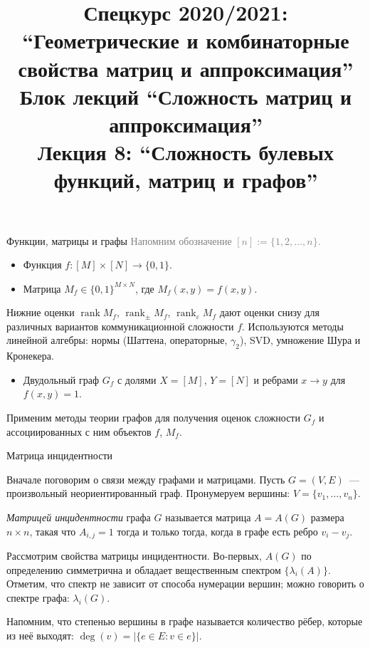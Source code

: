 \documentclass{beamer}
\title{Спецкурс 2020/2021: ``Геометрические и комбинаторные свойства матриц и
аппроксимация'' \\ Блок лекций ``Сложность матриц и аппроксимация'' \\ Лекция 8:
``Сложность булевых функций, матриц и графов''}
\newcommand\eps{\varepsilon}
\DeclareMathOperator{\rank}{rank}
\begin{document}
\maketitle

\begin{frame}{Функции, матрицы и графы}
    \textcolor{gray}{Напомним обозначение $[n]:=\{1,2,\ldots,n\}$.}

    \begin{itemize}
        \item Функция $f\colon [M]\times [N]\to\{0,1\}$.\pause
        \item Матрица $M_f\in\{0,1\}^{M\times N}$, где $M_f(x,y)=f(x,y)$.\pause
    \end{itemize}

    Нижние оценки $\rank M_f$, $\rank_\pm M_f$, $\rank_\eps M_f$ дают
    оценки снизу для различных вариантов коммуникационной сложности $f$.
    Используются методы линейной алгебры: нормы (Шаттена, операторные,
    $\gamma_2$), SVD, умножение Шура и Кронекера.\pause

    \begin{itemize}
        \item Двудольный граф $G_f$ с долями $X=[M]$, $Y=[N]$ и ребрами $x\to y$
            для $f(x,y)=1$.
    \end{itemize}
    \pause

    Применим методы теории графов для получения оценок сложности $G_f$ и
    ассоциированных с ним объектов $f$, $M_f$.

\end{frame}

\begin{frame}{Матрица инцидентности}

    Вначале поговорим о связи между графами и матрицами. Пусть $G=(V,E)$~---
    произвольный неориентированный граф. Пронумеруем вершины:
    $V=\{v_1,\ldots,v_n\}$.
    \pause\vspace{5pt}

    \textit{Матрицей инцидентности} графа $G$ называется матрица $A=A(G)$ размера
    $n\times n$, такая что $A_{i,j}=1$ тогда и только тогда, когда в графе
    есть ребро $v_i-v_j$.
    \pause\vspace{5pt}

    Рассмотрим свойства матрицы инцидентности. Во-первых, $A(G)$ по определению
    симметрична и обладает вещественным спектром $\{\lambda_i(A)\}$. Отметим,
    что спектр не зависит от способа нумерации вершин; можно говорить о спектре
    графа: $\lambda_i(G)$.
    \pause\vspace{5pt}

    Напомним, что степенью вершины в графе называется количество рёбер, которые
    из неё выходят: $\deg(v)=|\{e\in E\colon v\in e\}|$.
\end{frame}
\end{document}

